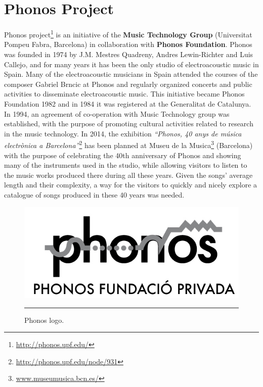 
\section{Phonos Project}
Phonos project\footnote{\url{http://phonos.upf.edu/}} is an initiative of the \textbf{Music Technology Group} (Universitat Pompeu Fabra, Barcelona) in collaboration with \textbf{Phonos Foundation}. Phonos was founded in 1974 by J.M. Mestres Quadreny, Andres Lewin-Richter and Luis Callejo, and for many years it has been the only studio of electroacoustic music in Spain. Many of the electroacoustic musicians in Spain attended the courses of the composer Gabriel Brncic at Phonos and regularly organized concerts and public activities to disseminate electroacoustic music. This initiative became Phonos Foundation 1982 and in 1984 it was registered at the Generalitat de Catalunya. In 1994, an agreement of co-operation with Music Technology group was established, with the purpose of promoting cultural activities related to research in the music technology. 
In 2014, the exhibition \textit{``Phonos, 40 anys de música electrònica a Barcelona''}\footnote{\url{http://phonos.upf.edu/node/931}} has been planned at Museu de la Musica\footnote{\url{www.museumusica.bcn.es/}} (Barcelona) with the purpose of celebrating the 40th anniversary of Phonos and showing many of the instruments used in the studio, while allowing visitors to listen to the music works produced there during all these years. Given the songs' average length and their complexity, a way for the visitors to quickly and nicely explore a catalogue of songs produced in these 40 years was needed.

\begin{figure}[htbp]
  \centering
    \includegraphics{Figures/phonos.png}
    \rule{15em}{0.5pt}
  \caption[Phonos]{Phonos logo.}
  \label{fig:Phonos}
\end{figure}


